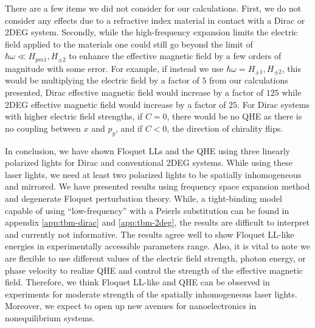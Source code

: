 There are a few items we did not consider for our calculations.
First, we do not consider any effects due to a refractive index material in contact with a Dirac or 2DEG system.
Secondly, while the high-frequency expansion limits the electric field applied to the materials one could still go beyond the limit of $\hbar \omega \ll H_{pm1}, H_{\pm2}$ to enhance the effective magnetic field by a few orders of magnitude with some error.
For example, if instead we use $\hbar\omega = H_{\pm1}, H_{\pm2}$, this would be multiplying the electric field by a factor of $5$ from our calculations presented, Dirac effective magnetic field would increase by a factor of $125$ while 2DEG effective magnetic field would increase by a factor of $25$.
For Dirac systems with higher electric field strengths, if $C=0$, there would be no QHE as there is no coupling between $x$ and $p_y$, and if $C<0$, the direction of chirality flips.

In conclusion, we have shown Floquet LLs and the QHE using three linearly polarized lights for Dirac and conventional 2DEG systems.
While using these laser lights, we  need at least two polarized lights to be spatially inhomogeneous and mirrored.
We have presented results using frequency space expansion method and degenerate Floquet perturbation theory.
While, a tight-binding model capable of using ``low-frequency'' with a Peierls substitution can be found in appendix \ref{app:tbm-dirac} and \ref{app:tbm-2deg}, the results are difficult to interpret and currently not informative.
The results agree well to show Floquet LL-like energies in experimentally accessible parameters range.
Also, it is vital to note we are flexible to use different values of the electric field strength, photon energy, or phase velocity to realize QHE and control the strength of the effective magnetic field.
Therefore, we think Floquet LL-like and QHE can be observed in experiments for moderate strength of the spatially inhomogeneous laser lights. Moreover, we expect to open up new avenues for nanoelectronics in nonequilibrium systems.


